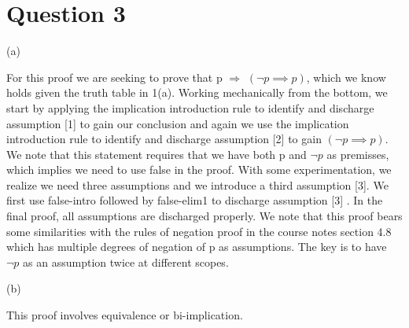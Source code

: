 \documentclass[a4paper,10pt,fleqn]{article}
\begin{document}
\setlength{\leftskip}{0pt}
\section*{Question 3}

\noindent\hspace*{\parindent}(a)

\begin{center}
\end{center}
\bigskip


\bigskip

\setlength{\leftskip}{\dimexpr\parindent+2em\relax}
\noindent For this proof we are seeking to prove that p $\Rightarrow$ $(\lnot p \implies p)$, which we know holds given the truth table in 1(a). Working mechanically from the bottom, we start by applying the implication introduction rule to identify and discharge assumption [1] to gain our conclusion \citep[Slide 3]{simpson25h} and again we use the implication introduction rule to identify and discharge assumption [2] to gain $(\lnot p \implies p)$.  We note that this statement requires that we have both p and $\lnot p$ as premisses, which implies we need to use false in the proof. With some experimentation, we realize we need three assumptions and we introduce a third assumption [3]. We first use false-intro followed by false-elim1 to discharge assumption [3] \citep[Slide 6]{simpson25h}. In the final proof, all assumptions are discharged properly. We note that this proof bears some similarities with the rules of negation proof in the course notes section 4.8 \citep[Pages 41-46]{simpson-notes} which has multiple degrees of negation of p as assumptions. The key is to have $\lnot p$ as an assumption twice at different scopes. 

\bigskip

\newpage

\setlength{\leftskip}{0pt}
\medskip

\noindent\hspace*{\parindent}(b)

\setlength{\leftskip}{\dimexpr\parindent+2em\relax}
\noindent This proof involves equivalence or bi-implication.
\end{document}
